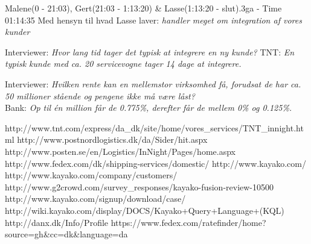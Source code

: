 \begin{thebibliography}{9}
	Malene(0 - 21:03), Gert(21:03 - 1:13:20) \& Lasse(1:13:20 - slut).3ga - Time 01:14:35
	Med hensyn til hvad Lasse laver: \textit{handler meget om integration af vores kunder}

	Interviewer: \textit{Hvor lang tid tager det typisk at integrere en ny kunde?}
	TNT: \textit{En typisk kunde med ca. 20 servicevogne tager 14 dage at integrere.}

	Interviewer: \textit{Hvilken rente kan en mellemstor virksomhed få, forudsat de har ca. 50 millioner stående og pengene ikke må være låst?}\\
	Bank: \textit{Op til én million får de 0.775\%, derefter får de mellem 0\% og 0.125\%.}

	http://www.tnt.com/express/da\_dk/site/home/vores\_services/TNT\_innight.html
	http://www.postnordlogistics.dk/da/Sider/hit.aspx
	http://www.posten.se/en/Logistics/InNight/Pages/home.aspx
	http://www.fedex.com/dk/shipping-services/domestic/
	http://www.kayako.com/
	http://www.kayako.com/company/customers/
	http://www.g2crowd.com/survey\_responses/kayako-fusion-review-10500
	http://www.kayako.com/signup/download/case/
	http://wiki.kayako.com/display/DOCS/Kayako+Query+Language+(KQL)
	http://danx.dk/Info/Profile
	https://www.fedex.com/ratefinder/home?source=gh\&cc=dk\&language=da


\end{thebibliography}
